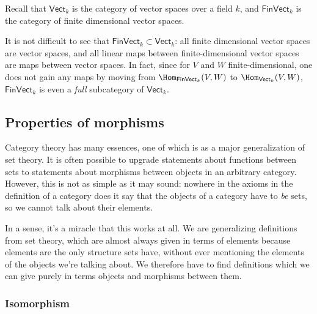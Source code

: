 \documentclass[main.tex]{subfiles}
\begin{document}
\begin{example}
  \label{eg:finvectfullsubcategoryofvect}
  Recall that $\mathsf{Vect}_{k}$ is the category of vector spaces over a field $k$, and $\mathsf{FinVect}_{k}$ is the category of finite dimensional vector spaces.

  It is not difficult to see that $\mathsf{FinVect}_{k} \subset \mathsf{Vect}_{k}$: all finite dimensional vector spaces are vector spaces, and all linear maps between finite-dimensional vector spaces are maps between vector spaces. In fact, since for $V$ and $W$ finite-dimensional, one does not gain any maps by moving from $\Hom_{\mathsf{FinVect}_{k}}(V, W)$ to $\Hom_{\mathsf{Vect}_{k}}(V, W)$, $\mathsf{FinVect}_{k}$ is even a \emph{full\/} subcategory of $\mathsf{Vect}_{k}$.
\end{example}


\subsection{Properties of morphisms}

Category theory has many essences, one of which is as a major generalization of set theory. It is often possible to upgrade statements about functions between sets to statements about morphisms between objects in an arbitrary category. However, this is not as simple as it may sound: nowhere in the axioms in the definition of a category does it say that the objects of a category have to \emph{be\/} sets, so we cannot talk about their elements.

In a sense, it's a miracle that this works at all. We are generalizing definitions from set theory, which are almost always given in terms of elements because elements are the only structure sets have, without ever mentioning the elements of the objects we're talking about. We therefore have to find definitions which we can give purely in terms objects and morphisms between them.

\subsubsection{Isomorphism}
\end{document}
